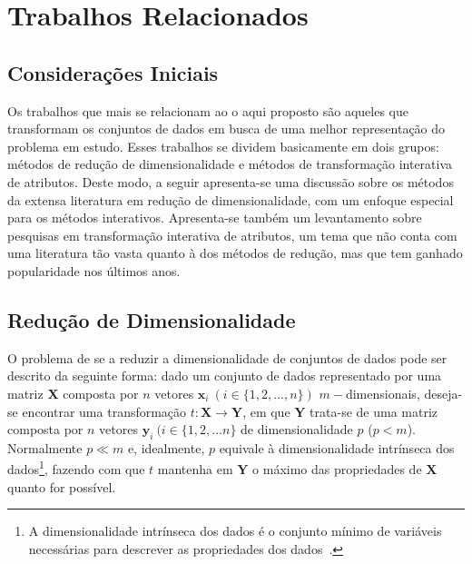 \chapter{Trabalhos Relacionados}\label{chap:revisao}

\section{Considerações Iniciais}

Os trabalhos que mais se relacionam ao o aqui proposto são
aqueles que transformam os conjuntos de dados em busca de
uma melhor representação do problema em estudo. 
Esses trabalhos se dividem basicamente em dois grupos:
métodos de redução de dimensionalidade e métodos de
transformação interativa de atributos. 
Deste modo, a seguir apresenta-se uma discussão sobre os
métodos da extensa literatura em redução de
dimensionalidade, com um enfoque especial para os métodos
interativos. Apresenta-se também um levantamento sobre
pesquisas em transformação interativa de
atributos, um tema que não conta com uma literatura tão
vasta quanto à dos métodos de redução, mas que tem ganhado
popularidade nos últimos anos.

\section{Redução de Dimensionalidade}

O problema de se a reduzir a dimensionalidade de conjuntos
de dados pode ser descrito da seguinte forma: dado um
conjunto de dados representado por uma matriz $\textbf{X}$
composta por $n$ vetores $\textbf{x}_i~(i \in
\{1,2,...,n\})$ $m-$dimensionais, deseja-se encontrar uma
transformação $t: \textbf{X} \rightarrow \textbf{Y}$, em que 
$\textbf{Y}$ trata-se de uma matriz composta por $n$ vetores
$\textbf{y}_i~(i \in \{1,2,...n\}$ de dimensionalidade $p$
($p < m$).  Normalmente $p \ll m$ e, idealmente, $p$
equivale à dimensionalidade intrínseca dos dados\footnote{A
dimensionalidade intrínseca dos dados é o conjunto mínimo de
variáveis necessárias para descrever as propriedades dos
dados~\cite{Fukunaga1990}.}, fazendo com que $t$ mantenha em
$\textbf{Y}$ o máximo das propriedades de $\textbf{X}$
quanto for possível. 

